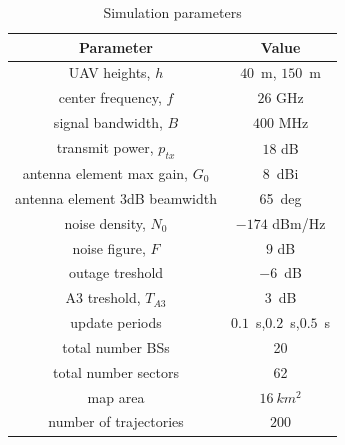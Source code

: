 \documentclass[conference,twocolumn]{IEEEtran}
\begin{document}
\begin{table}[bp]
\caption{Simulation parameters}
\begin{center}
\begin{tabular}{|c|c|}
\hline
\textbf{Parameter} & \textbf{Value}       \\
\hline
\hline
UAV heights, $h$       & $40$~m, $150$~m   \\
center frequency, $f$       & $26$ GHz      \\
signal bandwidth, $B$       & $400$ MHz      \\
transmit power, $p_{tx}$    & $18$ dB       \\
antenna element max gain, $G_0$ & $8$~dBi\\
antenna element 3dB beamwidth & 65~deg \\
noise density, $N_0$          & $-174$ dBm/Hz        \\
noise figure, $F$               & $9$ dB         \\
outage treshold & $-6$~dB \\
A3 treshold, $T_{A3}$ & $3$~dB\\ 
update periods & $0.1$~s,$0.2$~s,$0.5$~s\\
total number BSs & 20\\
total number sectors & 62\\
map area&$16~km^2$\\
number of trajectories        & $200$ \\
\hline
\end{tabular}
\label{tab:parameters}
\end{center}
\end{table}
\end{document}
